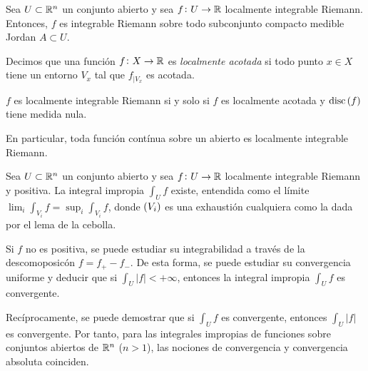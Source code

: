 \begin{prop}
    Sea $U\subset \mathbb{R}^n$ un conjunto abierto y sea $f\colon U \to \mathbb{R}$ localmente integrable Riemann. Entonces, $f$ es integrable Riemann sobre todo subconjunto compacto medible Jordan $A \subset U$.
\end{prop}

\begin{defi}
    Decimos que una función $f \colon X \to \mathbb{R}$ es \textit{localmente acotada} si todo punto $x \in X$ tiene un entorno $V_x$ tal que $f_{|V_x}$ es acotada.
\end{defi}

\begin{prop}
    $f$ es localmente integrable Riemann si y solo si $f$ es localmente acotada y $\operatorname{disc} \left( f \right)$ tiene medida nula.

    En particular, toda función contínua sobre un abierto es localmente integrable Riemann.
\end{prop}

\begin{col}
    Sea $U\subset \mathbb{R}^n$ un conjunto abierto y sea $f\colon U \to \mathbb{R}$ localmente integrable Riemann y positiva. La integral impropia $\int_U f$ existe, entendida como el límite $\lim_i \int_{V_i} f = \sup_i \int_{V_i} f$, donde $\left( V_i \right)$ es una exhaustión cualquiera como la dada por el lema de la cebolla.
\end{col}

\begin{obs}
    Si $f$ no es positiva, se puede estudiar su integrabilidad a través de la descomoposicón $f=f_+ - f_-$. De esta forma, se puede estudiar su convergencia uniforme y deducir que si $\int_U \left| f \right| < +\infty$, entonces la integral impropia $\int_U f$ es convergente.
\end{obs}


\begin{obs}
    Recíprocamente, se puede demostrar que si $\int_U f$ es convergente, entonces $\int_U \left| f \right|$ es convergente. Por tanto, para las integrales impropias de funciones sobre conjuntos abiertos de $\mathbb{R}^n$ ($n>1$), las nociones de convergencia y convergencia absoluta coinciden.  
\end{obs}
